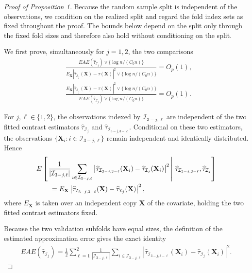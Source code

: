 \documentclass[11pt]{article}
\theoremstyle{referenceplain}
\theoremstyle{referencedefinition}
\theoremstyle{referenceremark}
\begin{document}
\begin{proof}[Proof of Proposition 1]
Because the random sample split is independent of the observations, we
condition on the realized split and regard the fold index sets as fixed
throughout the proof. The bounds below depend on the split only through
the fixed fold sizes and therefore also hold without conditioning on the
split.

We first prove, simultaneously for $j=1,2$, the two comparisons
\begin{align}
&
\frac{
EAE(\widehat\tau_{\mathcal I_j})\vee\{\log n/({C_0}n)\}
}{
E_{\mathbf X}
|\widehat\tau_{\mathcal I_j}(\mathbf X)-\tau(\mathbf X)|^2
\vee\{\log n/({C_0}n)\}
}
=O_p(1),
\label{eae-error-path}
\\
&
\frac{
E_{\mathbf X}
|\widehat\tau_{\mathcal I_j}(\mathbf X)-\tau(\mathbf X)|^2
\vee\{\log n/({C_0}n)\}
}{
EAE(\widehat\tau_{\mathcal I_j})\vee\{\log n/({C_0}n)\}
}
=O_p(1).
\label{error-to-eae}
\end{align}

For $j,\ell\in\{1,2\}$, the observations indexed by
$\mathcal I_{3-j,\ell}$ are independent of the two fitted contrast
estimators
$\widehat\tau_{\mathcal I_j}$ and
$\widehat\tau_{\mathcal I_{3-j,3-\ell}}$. Conditional on these two
estimators, the observations
$\{\mathbf X_i:i\in\mathcal I_{3-j,\ell}\}$ remain independent and
identically distributed. Hence
\begin{align}
&E\left[
\left.
\frac{1}{|\mathcal I_{3-j,\ell}|}
\sum_{i\in\mathcal I_{3-j,\ell}}
\left|
\widehat\tau_{\mathcal I_{3-j,3-\ell}}(\mathbf X_i)
-\widehat\tau_{\mathcal I_j}(\mathbf X_i)
\right|^2
\,\right|\,
\widehat\tau_{\mathcal I_{3-j,3-\ell}},
\widehat\tau_{\mathcal I_j}
\right]
\notag\\
&\qquad=
E_{\mathbf X}\left|
\widehat\tau_{\mathcal I_{3-j,3-\ell}}(\mathbf X)
-\widehat\tau_{\mathcal I_j}(\mathbf X)
\right|^2,
\label{conditional-eae-mean}
\end{align}
where $E_{\mathbf X}$ is taken over an independent copy $\mathbf X$ of
the covariate, holding the two fitted contrast estimators fixed.

Because the two validation subfolds have equal sizes, the definition of
the estimated approximation error gives the exact identity
\begin{align}
EAE(\widehat\tau_{\mathcal I_j})
=
\frac12\sum_{\ell=1}^2
\frac{1}{|\mathcal I_{3-j,\ell}|}
\sum_{i\in\mathcal I_{3-j,\ell}}
\left|
\widehat\tau_{\mathcal I_{3-j,3-\ell}}(\mathbf X_i)
-\widehat\tau_{\mathcal I_j}(\mathbf X_i)
\right|^2.
\label{exact-eae-expression}
\end{align}


\end{proof}
\end{document}

